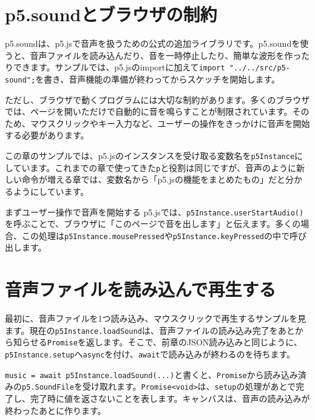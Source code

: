 \section{p5.soundとブラウザの制約}

p5.soundは、p5.jsで音声を扱うための公式の追加ライブラリです。p5.soundを使うと、音声ファイルを読み込んだり、音を一時停止したり、簡単な波形を作ったりできます。サンプルでは、p5.jsのimportに加えて\texttt{import "../../src/p5-sound";}を書き、音声機能の準備が終わってからスケッチを開始します。

ただし、ブラウザで動くプログラムには大切な制約があります。多くのブラウザでは、ページを開いただけで自動的に音を鳴らすことが制限されています。そのため、マウスクリックやキー入力など、ユーザーの操作をきっかけに音声を開始する必要があります。

この章のサンプルでは、p5.jsのインスタンスを受け取る変数名を\texttt{p5Instance}にしています。これまでの章で使ってきた\texttt{p}と役割は同じですが、音声のように新しい命令が増える章では、変数名から「p5.jsの機能をまとめたもの」だと分かるようにしています。

\begin{pointbox}{まずユーザー操作で音声を開始する}
p5.jsでは、\texttt{p5Instance.userStartAudio()}を呼ぶことで、ブラウザに「このページで音を出します」と伝えます。多くの場合、この処理は\texttt{p5Instance.mousePressed}や\texttt{p5Instance.keyPressed}の中で呼び出します。
\end{pointbox}

\section{音声ファイルを読み込んで再生する}

最初に、音声ファイルを1つ読み込み、マウスクリックで再生するサンプルを見ます。現在の\texttt{p5Instance.loadSound}は、音声ファイルの読み込み完了をあとから知らせる\texttt{Promise}を返します。そこで、前章のJSON読み込みと同じように、\texttt{p5Instance.setup}へ\texttt{async}を付け、\texttt{await}で読み込みが終わるのを待ちます。

\texttt{music = await p5Instance.loadSound(...)}と書くと、\texttt{Promise}から読み込み済みの\texttt{p5.SoundFile}を受け取れます。\texttt{Promise<void>}は、\texttt{setup}の処理があとで完了し、完了時に値を返さないことを表します。キャンバスは、音声の読み込みが終わったあとに作ります。

\begin{listing}[htbp]
\inputminted{ts}{typescript-p5/listings/chapter17/play-sound.ts}
\caption{マウスクリックで音声を再生する（\texttt{chapter17/play-sound.ts}）}
\label{lst:chapter17-play-sound}
\end{listing}

